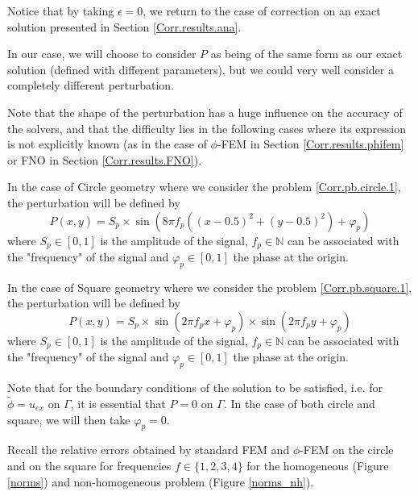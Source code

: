 \begin{Rem}
	Notice that by taking $\epsilon=0$, we return to the case of correction on an exact solution presented in Section \ref{Corr.results.ana}. 
\end{Rem}

In our case, we will choose to consider $P$ as being of the same form as our exact solution (defined with different parameters), but we could very well consider a completely different perturbation. 

\begin{Rem}
	Note that the shape of the perturbation has a huge influence on the accuracy of the solvers, and that the difficulty lies in the following cases where its expression is not explicitly known (as in the case of $\phi$-FEM in Section \ref{Corr.results.phifem} or FNO in Section \ref{Corr.results.FNO}).
\end{Rem}

In the case of Circle geometry where we consider the problem \ref{Corr.pb.circle.1}, the perturbation will be defined by
\begin{equation*}
	P(x,y)=S_p\times\sin\left(8\pi f_p\left((x-0.5)^2+(y-0.5)^2\right)+\varphi_p\right)
\end{equation*}
where $S_p\in[0,1]$ is the amplitude of the signal, $f_p\in\mathbb{N}$ can be associated with the "frequency" of the signal and $\varphi_p\in[0,1]$ the phase at the origin.

In the case of Square geometry where we consider the problem \ref{Corr.pb.square.1}, the perturbation will be defined by
\begin{equation*}
	P(x,y)=S_p\times\sin\left(2\pi f_px+\varphi_p\right)\times\sin\left(2\pi f_py+\varphi_p\right)
\end{equation*}
where $S_p\in[0,1]$ is the amplitude of the signal, $f_p\in\mathbb{N}$ can be associated with the "frequency" of the signal and $\varphi_p\in[0,1]$ the phase at the origin.

\begin{Rem}
	Note that for the boundary conditions of the solution to be satisfied, i.e. for $\tilde{\phi}=u_{ex}$ on $\Gamma$, it is essential that $P=0$ on $\Gamma$. In the case of both circle and square, we will then take $\varphi_p=0$.
\end{Rem}

Recall the relative errors obtained by standard FEM and $\phi$-FEM on the circle and on the square for frequencies $f\in\{1,2,3,4\}$ for the homogeneous  (Figure \ref{norms}) and non-homogeneous problem  (Figure \ref{norms_nh}).

